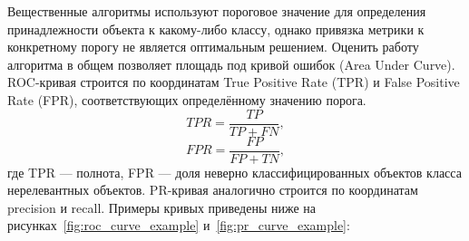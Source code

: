 Вещественные алгоритмы используют пороговое значение для определения принадлежности объекта к какому-либо классу, однако привязка метрики к конкретному порогу не является оптимальным решением.
Оценить работу алгоритма в общем позволяет площадь под кривой ошибок (Area Under Curve).
ROC-кривая строится по координатам True Positive Rate (TPR) и False Positive Rate (FPR), соответствующих определённому значению порога.
\begin{equation}\label{eq:tpr}
TPR = \frac{TP}{TP + FN},
\end{equation}
\begin{equation}\label{eq:fpr}
FPR = \frac{FP}{FP + TN},
\end{equation}
где TPR --- полнота, FPR --- доля неверно классифицированных объектов класса нерелевантных объектов.
PR-кривая аналогично строится по координатам precision и recall.
Примеры кривых приведены ниже на рисунках~\ref{fig:roc_curve_example} и~\ref{fig:pr_curve_example}:
